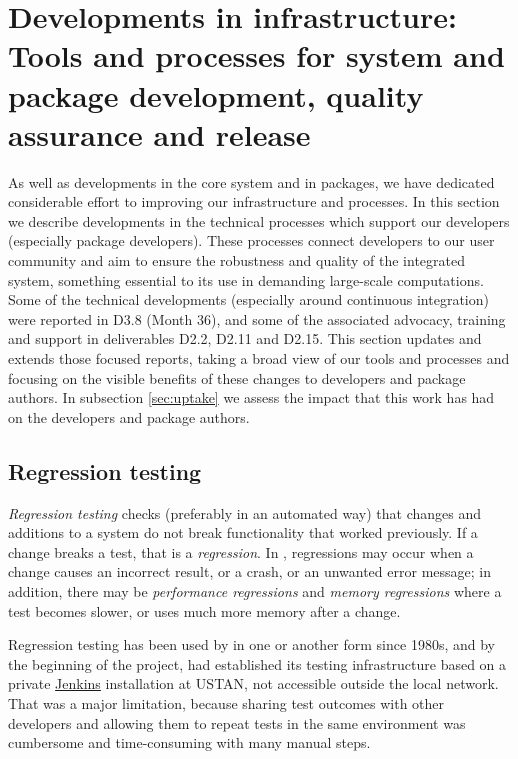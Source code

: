 \section{Developments in \GAP infrastructure: Tools and processes for
  system and package development, quality assurance and release }\label{sec:gap-infra}

As well as developments in the core system and in packages, we have
dedicated considerable effort to improving our infrastructure and
processes.  In this section we describe developments in the technical
processes which support our developers (especially package
developers). These processes connect developers to our user community and aim to ensure the
robustness and quality of the integrated system, something essential
to its use in demanding large-scale computations. Some of the
technical developments (especially around continuous integration) were
reported in D3.8 (Month 36), and some of the associated advocacy,
training and support in deliverables D2.2, D2.11 and D2.15. This
section updates and extends those focused reports, taking a broad
view of our tools and processes and focusing on the visible benefits
of these changes to developers and package authors. In subsection
\ref{sec:uptake} we assess the impact that this work has
had on the developers and package authors.

\subsection{Regression testing}\label{testing}

\emph{Regression testing} %
checks (preferably in an automated way)
that changes and additions to a system do not break functionality that 
worked previously. If a change breaks a test, that is 
a \emph{regression}. In \GAP, regressions may occur
when a change causes an incorrect result, or a crash, or an unwanted error
message; in addition, there may be \emph{performance regressions}
and \emph{memory regressions} where a test becomes slower, or uses
much more memory after a change.

Regression testing has been used by \GAP in one or another form since 
1980s, and by the beginning of the \ODK project, \GAP had established its testing infrastructure
based on a private \href{https://jenkins.io/}{\sf Jenkins} installation
at USTAN, not accessible outside the local network. That was a major limitation,
because sharing test outcomes with other developers and
allowing them to repeat tests in the same environment was cumbersome
and time-consuming with many manual steps.

